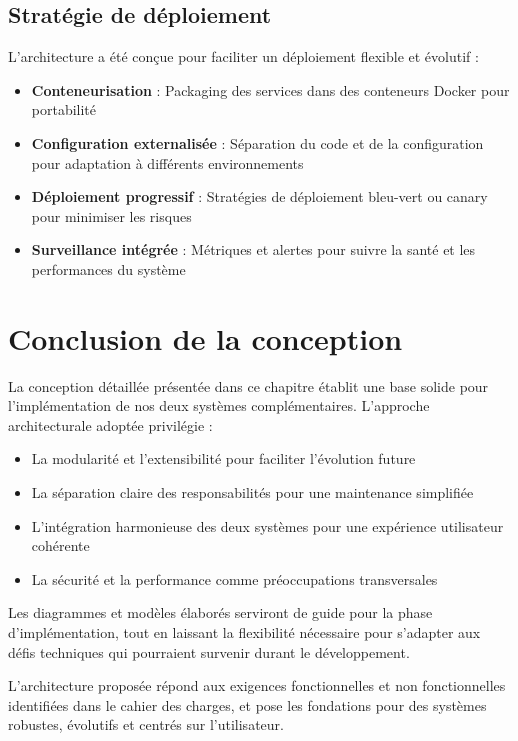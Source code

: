 \subsection{Stratégie de déploiement}

L'architecture a été conçue pour faciliter un déploiement flexible et évolutif :

\begin{itemize}
  \item \textbf{Conteneurisation} : Packaging des services dans des conteneurs Docker pour portabilité
  
  \item \textbf{Configuration externalisée} : Séparation du code et de la configuration pour adaptation à différents environnements
  
  \item \textbf{Déploiement progressif} : Stratégies de déploiement bleu-vert ou canary pour minimiser les risques
  
  \item \textbf{Surveillance intégrée} : Métriques et alertes pour suivre la santé et les performances du système
\end{itemize}

\section{Conclusion de la conception}

La conception détaillée présentée dans ce chapitre établit une base solide pour l'implémentation de nos deux systèmes complémentaires. L'approche architecturale adoptée privilégie :

\begin{itemize}
  \item La modularité et l'extensibilité pour faciliter l'évolution future
  
  \item La séparation claire des responsabilités pour une maintenance simplifiée
  
  \item L'intégration harmonieuse des deux systèmes pour une expérience utilisateur cohérente
  
  \item La sécurité et la performance comme préoccupations transversales
\end{itemize}

Les diagrammes et modèles élaborés serviront de guide pour la phase d'implémentation, tout en laissant la flexibilité nécessaire pour s'adapter aux défis techniques qui pourraient survenir durant le développement.

L'architecture proposée répond aux exigences fonctionnelles et non fonctionnelles identifiées dans le cahier des charges, et pose les fondations pour des systèmes robustes, évolutifs et centrés sur l'utilisateur. 